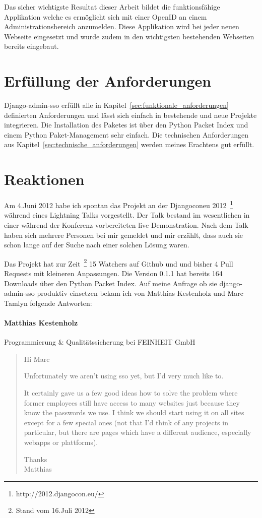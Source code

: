 Das sicher wichtigste Resultat dieser Arbeit bildet die funktionsfähige Applikation welche es ermöglicht sich mit einer OpenID an einem Administrationsbereich anzumelden. Diese Applikation wird bei jeder neuen Webseite eingesetzt und wurde zudem in den wichtigsten bestehenden Webseiten bereits eingebaut.

\section{Erfüllung der Anforderungen}
\label{sec:erfüllung_der_anforderungen}
Django-admin-sso erfüllt alle in Kapitel~\ref{sec:funktionale_anforderungen} definierten Anforderungen und lässt sich einfach in bestehende und neue Projekte integrieren. Die Installation des Paketes ist über den Python Packet Index und einem Python Paket-Management sehr einfach. Die technischen Anforderungen aus Kapitel~\ref{sec:technische_anforderungen} werden meines Erachtens gut erfüllt.

\section{Reaktionen}
\label{sec:reaktionen}
Am 4.Juni 2012 habe ich spontan das Projekt an der Djangoconeu 2012~\footnote{http://2012.djangocon.eu/} während eines Lightning Talks vorgestellt. Der Talk bestand im wesentlichen in einer während der Konferenz vorbereiteten live Demonstration. Nach dem Talk haben sich mehrere Personen bei mir gemeldet und mir erzählt, dass auch sie schon lange auf der Suche nach einer solchen Lösung waren.

Das Projekt hat zur Zeit~\footnote{Stand vom 16.Juli 2012} 15 Watchers auf Github und und bisher 4 Pull Requests mit kleineren Anpassungen. Die Version 0.1.1 hat bereits 164 Downloads über den Python Packet Index. Auf meine Anfrage ob sie django-admin-sso produktiv einsetzen bekam ich von Matthias Kestenholz und Marc Tamlyn folgende Antworten:

\paragraph{Matthias Kestenholz}
Programmierung \& Qualitätssicherung bei FEINHEIT GmbH
\begin{quote}
  Hi Marc

  Unfortunately we aren't using sso yet, but I'd very much like to.

  It certainly gave us a few good ideas how to solve the problem where
  former employees still have access to many websites just because they
  know the passwords we use. I think we should start using it on all
  sites except for a few special ones (not that I'd think of any
  projects in particular, but there are pages which have a different
  audience, especially webapps or plattforms).


  Thanks \\
  Matthias
\end{quote}

